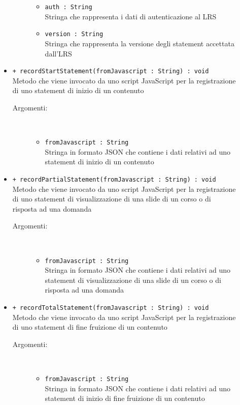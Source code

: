 \documentclass[../Tesi.tex]{subfiles}
\begin{document}
\begin{description}
\begin{itemize}
\begin{description}
\begin{itemize}
						\item \texttt{auth : String}\\
						Stringa che rappresenta i dati di autenticazione al LRS

						\item \texttt{version : String}\\
						Stringa che rappresenta la versione degli statement accettata dall'LRS
					\end{itemize}
				\end{description}

				\item \texttt{+ recordStartStatement(fromJavascript : String) : void}\\
				Metodo che viene invocato da uno script JavaScript per la registrazione di uno statement di inizio di un contenuto
				\begin{description}
					\item[Argomenti:] \
					\begin{itemize}
						\item \texttt{fromJavascript : String}\\
						Stringa in formato JSON che contiene i dati relativi ad uno statement di inizio di un contenuto
					\end{itemize}
				\end{description}

				\item \texttt{+ recordPartialStatement(fromJavascript : String) : void}\\
				Metodo che viene invocato da uno script JavaScript per la registrazione di uno statement di visualizzazione di una slide di un corso o di risposta ad una domanda
				\begin{description}
					\item[Argomenti:] \
					\begin{itemize}
						\item \texttt{fromJavascript : String}\\
						Stringa in formato JSON che contiene i dati relativi ad uno statement di visualizzazione di una slide di un corso o di risposta ad una domanda
					\end{itemize}
				\end{description}

				\item \texttt{+ recordTotalStatement(fromJavascript : String) : void}\\
				Metodo che viene invocato da uno script JavaScript per la registrazione di uno statement di fine fruizione di un contenuto
				\begin{description}
					\item[Argomenti:] \
					\begin{itemize}
						\item \texttt{fromJavascript : String}\\
						Stringa in formato JSON che contiene i dati relativi ad uno statement di inizio di fine fruizione di un contenuto
					\end{itemize}
				\end{description}


\end{itemize}
\end{description}
\end{document}
